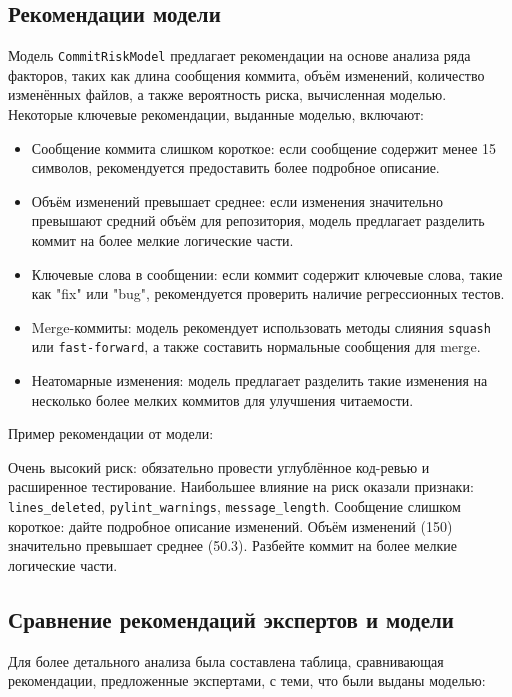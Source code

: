 \subsection{Рекомендации модели}

Модель \texttt{CommitRiskModel} предлагает рекомендации на основе анализа ряда факторов, таких как длина сообщения коммита, объём изменений, количество изменённых файлов, а также вероятность риска, вычисленная моделью. Некоторые ключевые рекомендации, выданные моделью, включают:

\begin{itemize}
	\item Сообщение коммита слишком короткое: если сообщение содержит менее 15 символов, рекомендуется предоставить более подробное описание.
	\item Объём изменений превышает среднее: если изменения значительно превышают средний объём для репозитория, модель предлагает разделить коммит на более мелкие логические части.
	\item Ключевые слова в сообщении: если коммит содержит ключевые слова, такие как "fix" или "bug", рекомендуется проверить наличие регрессионных тестов.
	\item Merge-коммиты: модель рекомендует использовать методы слияния \texttt{squash} или \texttt{fast-forward}, а также составить нормальные сообщения для merge.
	\item Неатомарные изменения: модель предлагает разделить такие изменения на несколько более мелких коммитов для улучшения читаемости.
\end{itemize}

Пример рекомендации от модели:

Очень высокий риск: обязательно провести углублённое код-ревью и расширенное тестирование. Наибольшее влияние на риск оказали признаки: \verb|lines_deleted|, \verb|pylint_warnings|, \verb|message_length|. Сообщение слишком короткое: дайте подробное описание изменений. Объём изменений (150) значительно превышает среднее (50.3). Разбейте коммит на более мелкие логические части.

\subsection{Сравнение рекомендаций экспертов и модели}

Для более детального анализа была составлена таблица, сравнивающая рекомендации, предложенные экспертами, с теми, что были выданы моделью:

